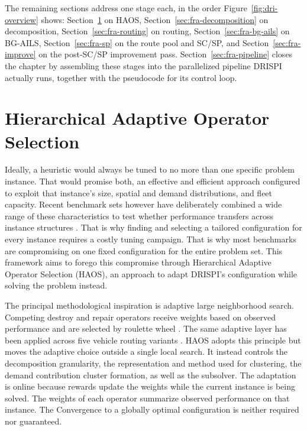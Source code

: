 The remaining sections address one stage each, in the order Figure~\ref{fig:dri-overview} shows: Section~\ref{sec:fra-haos} on HAOS, Section~\ref{sec:fra-decomposition} on decomposition, Section~\ref{sec:fra-routing} on routing, Section~\ref{sec:fra-bg-ails} on BG-AILS, Section~\ref{sec:fra-sp} on the route pool and SC/SP, and Section~\ref{sec:fra-improve} on the post-SC/SP improvement pass. Section~\ref{sec:fra-pipeline} closes the chapter by assembling these stages into the parallelized pipeline DRISPI actually runs, together with the pseudocode for its control loop.

\section{Hierarchical Adaptive Operator Selection}\label{sec:fra-haos}
Ideally, a heuristic would always be tuned to no more than one specific problem instance. That would promise both, an effective and efficient approach configured to exploit that instance's size, spatial and demand distributions, and fleet capacity. Recent benchmark sets however have deliberately combined a wide range of these characteristics to test whether performance transfers across instance structures \citep{uchoaNewBenchmarkInstances2017,queirogaXLInstancesCapacitated2026}. That is why finding and selecting a tailored configuration for every instance requires a costly tuning campaign. That is why most benchmarks are compromising on one fixed configuration for the entire problem set. This framework aims to forego this compromise through Hierarchical Adaptive Operator Selection (HAOS), an approach to adapt DRISPI's configuration while solving the problem instead.

The principal methodological inspiration is adaptive large neighborhood search. Competing destroy and repair operators receive weights based on observed performance and are selected by roulette wheel \citep{ropkeAdaptiveLargeNeighborhood2006}. The same adaptive layer has been applied across five vehicle routing variants \citep{pisingerGeneralHeuristicVehicle2007}. HAOS adopts this principle but moves the adaptive choice outside a single local search. It instead controls the decomposition granularity, the representation and method used for clustering, the demand contribution cluster formation, as well as the subsolver. The adaptation is online because rewards update the weights while the current instance is being solved. The weights of each operator summarize observed performance on that instance. The Convergence to a globally optimal configuration is neither required nor guaranteed.

